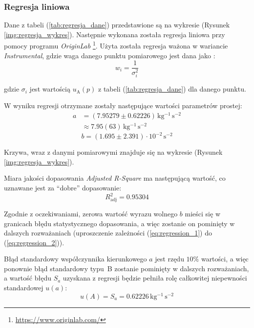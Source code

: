 \documentclass[twocolumn, a4paper, polish, 10pt]{article}
\begin{document}
\subsubsection{Regresja liniowa}
Dane z tabeli (\ref{tab:regresja_dane}) przedstawione są na wykresie (Rysunek \ref{img:regresja_wykres}). Następnie wykonana została regresja liniowa przy pomocy programu \textit{OriginLab} \footnote{\url{https://www.originlab.com/}}. Użyta została regresja ważona w wariancie \textit{Instrumental}, gdzie waga danego punktu pomiarowego jest dana jako \cite{origin_fitting_weighting}:
\begin{displaymath}
    w_i = \frac{1}{\sigma_i^2}
\end{displaymath}

gdzie $\sigma_i$ jest wartością $u_{\mathrm{A}}(p)$ z tabeli (\ref{tab:regresja_dane}) dla danego punktu.



W wyniku regresji otrzymane zostały następujące wartości parametrów prostej:
\begin{displaymath}
\begin{split}
    a &= (7.95279 \pm 0.62226) \, \mathrm{kg^{-1} \, s^{-2}} \\
    &\approx 7.95(63) \, \mathrm{kg^{-1} \, s^{-2}}
\end{split}
\end{displaymath}
\begin{displaymath}
    b = (1.695 \pm 2.391) \cdot 10^{-2} \, \mathrm{s^{-2}}
\end{displaymath}

Krzywa, wraz z danymi pomiarowymi znajduje się na wykresie (Rysunek \ref{img:regresja_wykres}).

Miara jakości dopasowania \textit{Adjusted R-Square} \cite{origin_adj_r_square} ma następującą wartość, co uznawane jest za \enquote{dobre} dopasowanie:
\begin{displaymath}
    R^2_{\mathrm{adj}} = 0.95304
\end{displaymath}

Zgodnie z oczekiwaniami, zerowa wartość wyrazu wolnego $b$ mieści się w granicach błędu statystycznego dopasowania, a więc zostanie on pominięty w dalszych rozważaniach (uproszczenie zależności (\ref{eq:regression_1}) do (\ref{eq:regression_2})).

Błąd standardowy współczynnika kierunkowego $a$ jest rzędu $10\%$ wartości, a więc ponownie błąd standardowy typu~B zostanie pominięty w dalszych rozważaniach, a wartość błędu $S_a$ uzyskana z regresji będzie pełniła rolę całkowitej niepewności standardowej $u(a)$:
\begin{displaymath}
    u(A) = S_a = 0.62226 \, \mathrm{kg^{-1} \, s^{-2}}
\end{displaymath}
\end{document}
